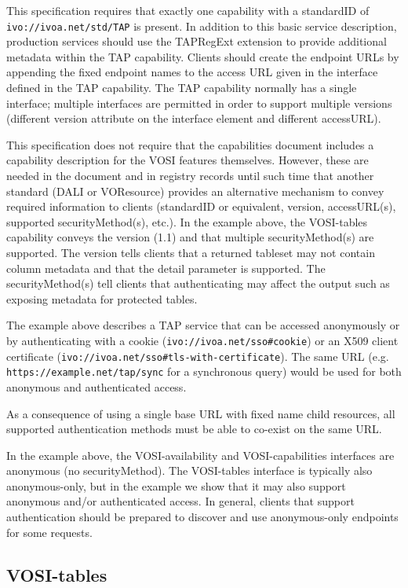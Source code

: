 \documentclass[11pt,letter]{ivoa}
\begin{document}
This specification requires that exactly one capability with a
standardID of \nolinkurl{ivo://ivoa.net/std/TAP} is present.
In addition to this basic service description, production services
should use the TAPRegExt \citep{2012ivoa.spec.0827D} extension to provide
additional metadata within the TAP capability. Clients should create
the endpoint URLs by appending the fixed endpoint names to the access URL
given in the interface defined in the TAP capability. The TAP capability normally
has a single interface; multiple interfaces are permitted in order to support multiple
versions (different version attribute on the interface element and different
accessURL).

This specification does not require that the capabilities document includes a capability
description for the VOSI features themselves. However, these are needed in the document 
and in registry records until such time that another standard (DALI or VOResource) 
provides an alternative mechanism to convey required information to clients 
(standardID or equivalent, version, accessURL(s), supported securityMethod(s), etc.). 
In the example above, the VOSI-tables capability conveys the version (1.1) and that multiple 
securityMethod(s) are supported. The version tells clients that a returned tableset may not 
contain column metadata and that the detail parameter is supported. The securityMethod(s) 
tell clients that authenticating may affect the output such as exposing metadata for 
protected tables.

The example above describes a TAP service that can be accessed anonymously or by authenticating with a cookie
(\verb|ivo://ivoa.net/sso#cookie|) or an X509 client certificate (\verb|ivo://ivoa.net/sso#tls-with-certificate|).
The same URL (e.g. \verb|https://example.net/tap/sync| for a synchronous query) would be used for both anonymous and authenticated access. 

As a consequence of using a single base URL with fixed name child resources, all supported authentication 
methods must be able to co-exist on the same URL.  

In the example above, the VOSI-availability and VOSI-capabilities interfaces are anonymous (no securityMethod). 
The VOSI-tables interface is typically also anonymous-only, but in the example we show that it may also support
anonymous and/or authenticated access. In general, clients that support authentication should be prepared to discover and use anonymous-only endpoints for some requests. 

\subsection{VOSI-tables}
\label{sec:vosi-tables}
\end{document}
